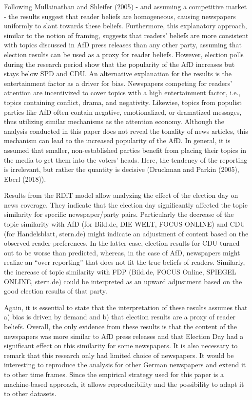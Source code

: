 \documentclass[
  12pt,
]{article}
\begin{document}
Following Mullainathan and Shleifer (2005) - and assuming a competitive
market - the results suggest that reader beliefs are homogeneous,
causing newspapers uniformly to slant towards these beliefs.
Furthermore, this explanatory approach, similar to the notion of
framing, suggests that readers' beliefs are more consistent with topics
discussed in AfD press releases than any other party, assuming that
election results can be used as a proxy for reader beliefs. However,
election polls during the research period show that the popularity of
the AfD increases but stays below SPD and CDU. An alternative
explanation for the results is the entertainment factor as a driver for
bias. Newspapers competing for readers' attention are incentivized to
cover topics with a high entertainment factor, i.e., topics containing
conflict, drama, and negativity. Likewise, topics from populist parties
like AfD often contain negative, emotionalized, or dramatized messages,
thus utilizing similar mechanisms as the attention economy. Although the
analysis conducted in this paper does not reveal the tonality of news
articles, this mechanism can lead to the increased popularity of the
AfD. In general, it is assumed that smaller, non-established parties
benefit from placing their topics in the media to get them into the
voters' heads. Here, the tendency of the reporting is irrelevant, but
rather the quantity is decisive (Druckman and Parkin (2005), Eberl
(2018)).

Results from the RDiT model allow analyzing the effect of the election
day on news coverage. They indicate that the election day significantly
affected the topic similarity for specific newspaper/party pairs.
Particularly the decrease of the topic similarity with AfD (for Bild.de,
DIE WELT, FOCUS ONLINE) and CDU (for Handelsblatt, stern.de) might
indicate an adjustment of content based on the observed reader
preferences. In the latter case, election results for CDU turned out to
be worse than predicted, whereas, in the case of AfD, newspapers might
realize an ``over-reporting'' that does not fit the true beliefs of
readers. Similarly, the increase of topic similarity with FDP (Bild.de,
FOCUS Online, SPIEGEL ONLINE, stern.de) could be interpreted as an
upward adjustment based on the good election results of that party.

Again, it is essential to state that the interpretation of these results
assumes that a) bias is driven by demand and b) that election results
are a proxy of reader beliefs. Overall, the only evidence from these
results is that the content of the newspapers was more similar to AfD
press releases and that Election Day had a significant effect on this
similarity for some newspapers. It is also necessary to remark that this
research only had limited choice of newspapers. It would be interesting
to reproduce the analysis for other German newspapers and extend it to
other time frames. Since the empirical strategy used for this paper is a
machine-based approach, it allows reproducibility and the possibility to
adapt it to other datasets.
\end{document}

